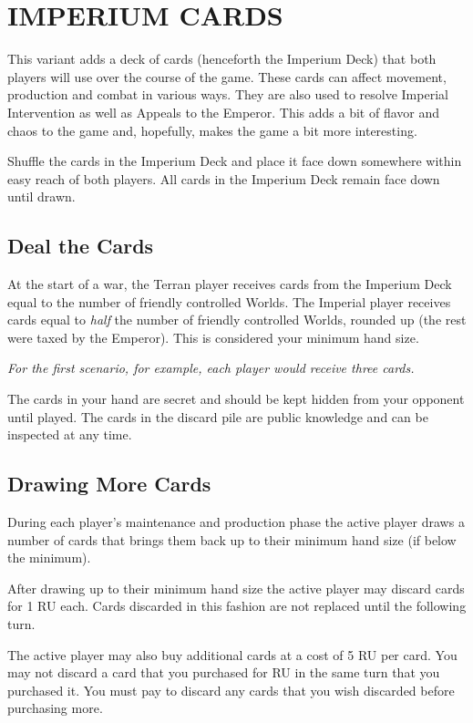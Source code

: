 \section{IMPERIUM CARDS}
\hfill

This variant adds a deck of cards (henceforth the Imperium Deck) that both players will use over the course of the game. These cards can affect movement, production and combat in various ways. They are also used to resolve Imperial Intervention as well as Appeals to the Emperor. This adds a bit of flavor and chaos to the game and, hopefully, makes the game a bit more interesting.

Shuffle the cards in the Imperium Deck and place it face down somewhere within easy reach of both players. All cards in the Imperium Deck remain face down until drawn.

\subsection{Deal the Cards}

At the start of a war, the Terran player receives cards from the Imperium Deck equal to the number of friendly controlled Worlds. The Imperial player receives cards equal to \textit{half} the number of friendly controlled Worlds, rounded up (the rest were taxed by the Emperor). This is considered your minimum hand size.

\textit{For the first scenario, for example, each player would receive three cards.}

The cards in your hand are secret and should be kept hidden from your opponent until played. The cards in the discard pile are public knowledge and can be inspected at any time.

\subsection{Drawing More Cards}

During each player's maintenance and production phase the active player draws a number of cards that brings them back up to their minimum hand size (if below the minimum).

After drawing up to their minimum hand size the active player may discard cards for 1 RU each. Cards discarded in this fashion are not replaced until the following turn.

The active player may also buy additional cards at a cost of 5 RU per card. You may not discard a card that you purchased for RU in the same turn that you purchased it. You must pay to discard any cards that you wish discarded before purchasing more.

